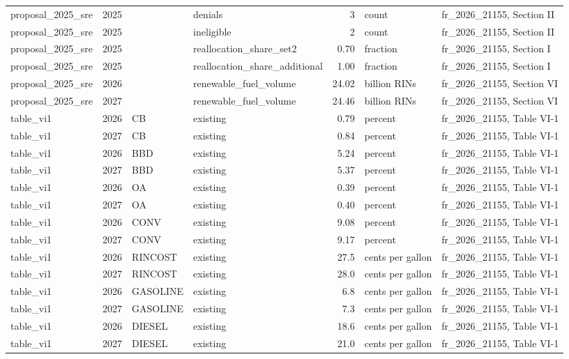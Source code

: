 \begin{longtable}{p{2.3cm}p{0.7cm}p{1.0cm}p{2.6cm}rp{1.7cm}p{4.6cm}}
proposal\_2025\_sre & 2025 &  & denials & 3 & count & fr\_2026\_21155, Section II \\
proposal\_2025\_sre & 2025 &  & ineligible & 2 & count & fr\_2026\_21155, Section II \\
proposal\_2025\_sre & 2025 &  & reallocation\_share\_set2 & 0.70 & fraction & fr\_2026\_21155, Section I \\
proposal\_2025\_sre & 2025 &  & reallocation\_share\_additional & 1.00 & fraction & fr\_2026\_21155, Section I \\
proposal\_2025\_sre & 2026 &  & renewable\_fuel\_volume & 24.02 & billion RINs & fr\_2026\_21155, Section VI \\
proposal\_2025\_sre & 2027 &  & renewable\_fuel\_volume & 24.46 & billion RINs & fr\_2026\_21155, Section VI \\
table\_vi1 & 2026 & CB & existing & 0.79 & percent & fr\_2026\_21155, Table VI-1 \\
table\_vi1 & 2027 & CB & existing & 0.84 & percent & fr\_2026\_21155, Table VI-1 \\
table\_vi1 & 2026 & BBD & existing & 5.24 & percent & fr\_2026\_21155, Table VI-1 \\
table\_vi1 & 2027 & BBD & existing & 5.37 & percent & fr\_2026\_21155, Table VI-1 \\
table\_vi1 & 2026 & OA & existing & 0.39 & percent & fr\_2026\_21155, Table VI-1 \\
table\_vi1 & 2027 & OA & existing & 0.40 & percent & fr\_2026\_21155, Table VI-1 \\
table\_vi1 & 2026 & CONV & existing & 9.08 & percent & fr\_2026\_21155, Table VI-1 \\
table\_vi1 & 2027 & CONV & existing & 9.17 & percent & fr\_2026\_21155, Table VI-1 \\
table\_vi1 & 2026 & RINCOST & existing & 27.5 & cents per gallon & fr\_2026\_21155, Table VI-1 \\
table\_vi1 & 2027 & RINCOST & existing & 28.0 & cents per gallon & fr\_2026\_21155, Table VI-1 \\
table\_vi1 & 2026 & GASOLINE & existing & 6.8 & cents per gallon & fr\_2026\_21155, Table VI-1 \\
table\_vi1 & 2027 & GASOLINE & existing & 7.3 & cents per gallon & fr\_2026\_21155, Table VI-1 \\
table\_vi1 & 2026 & DIESEL & existing & 18.6 & cents per gallon & fr\_2026\_21155, Table VI-1 \\
table\_vi1 & 2027 & DIESEL & existing & 21.0 & cents per gallon & fr\_2026\_21155, Table VI-1 \\

\end{longtable}
